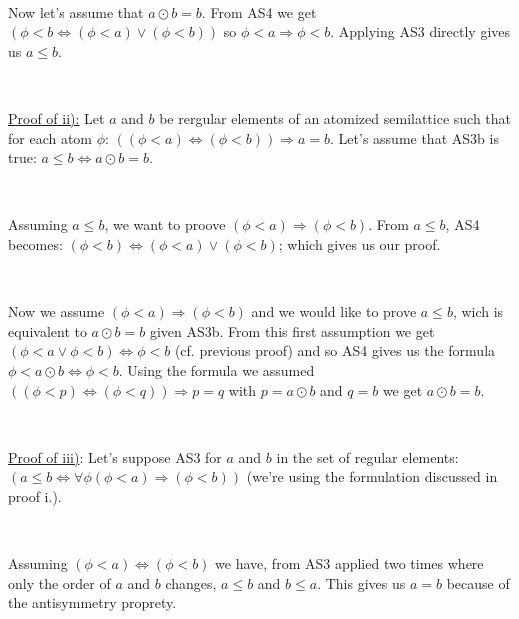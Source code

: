 \documentclass[a4paper, 11pt]{article}
\begin{document}
\

Now let's assume that $a \odot b = b$. From AS4 we get $(\phi < b \Leftrightarrow (\phi < a) \lor (\phi < b))$ so $\phi < a \Rightarrow \phi < b$. Applying AS3 directly gives us $a \leq b$.

\

\noindent
\underline{Proof of ii):} Let $a$ and $b$ be rergular elements of an atomized semilattice such that for each atom $\phi$: $((\phi < a) \Leftrightarrow (\phi <  b)) \Rightarrow a = b$. Let's assume that AS3b is true: $a \leq b \Leftrightarrow a \odot b = b$.

\

Assuming $a \leq b$, we want to proove $(\phi < a) \Rightarrow (\phi < b)$. From $a \leq b$, AS4 becomes: $(\phi < b) \Leftrightarrow (\phi < a) \lor (\phi < b)$; which gives us our proof.

\

Now we assume $(\phi < a) \Rightarrow (\phi < b)$ and we would like to prove $a \leq b$, wich is equivalent to $a \odot b = b$ given AS3b. From this first assumption we get $(\phi < a \lor \phi < b) \Leftrightarrow \phi < b$ (cf. previous proof) and so AS4 gives us the formula $\phi < a \odot b \Leftrightarrow \phi < b$. Using the formula we assumed $((\phi < p) \Leftrightarrow (\phi < q)) \Rightarrow p = q$ with $p = a \odot b$ and $q = b$ we get $a \odot b = b$.

\

\noindent
\underline{Proof of iii)}: Let's suppose AS3 for $a$ and $b$ in the set of regular elements: \\
$(a \leq b \Leftrightarrow \forall \phi (\phi < a) \Rightarrow (\phi < b))$ (we're using the formulation discussed in proof i.).

\

Assuming $(\phi < a) \Leftrightarrow (\phi < b)$ we have, from AS3 applied two times where only the order of $a$ and $b$ changes, $a \leq b$ and $b \leq a$. This gives us $a=b$ because of the antisymmetry proprety.
\end{document}

